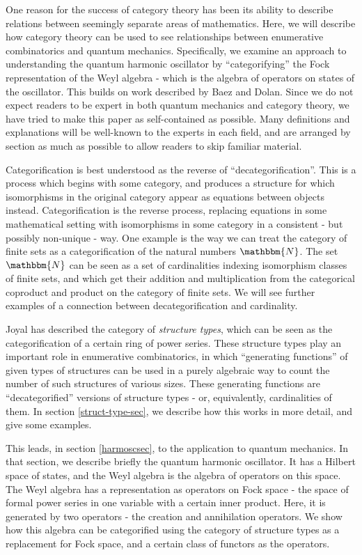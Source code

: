 \documentclass{amsart} \usepackage{amsmath,amssymb,bbm}
\begin{document}
One reason for the success of category theory has been its ability to
describe relations between seemingly separate areas of mathematics.
Here, we will describe how category theory can be used to see
relationships between enumerative combinatorics and quantum
mechanics. Specifically, we examine an approach to understanding the
quantum harmonic oscillator by ``categorifying'' the Fock
representation of the Weyl algebra - which is the algebra of operators
on states of the oscillator.  This builds on work described by Baez
and Dolan\cite{finfeyn}.  Since we do not expect readers to be expert
in both quantum mechanics and category theory, we have tried to make
this paper as self-contained as possible.  Many definitions and
explanations will be well-known to the experts in each field, and are
arranged by section as much as possible to allow readers to skip
familiar material.

Categorification is best understood as the reverse of
``decategorification''.  This is a process which begins with some
category, and produces a structure for which isomorphisms in the
original category appear as equations between objects instead.
Categorification is the reverse process, replacing equations in some
mathematical setting with isomorphisms in some category in a
consistent - but possibly non-unique - way.  One example is the way we
can treat the category of finite sets as a categorification of the
natural numbers $\mathbbm{N}$.  The set $\mathbbm{N}$ can be seen as a
set of cardinalities indexing isomorphism classes of finite sets, and
which get their addition and multiplication from the categorical
coproduct and product on the category of finite sets.  We will see
further examples of a connection between decategorification and
cardinality.

Joyal {\cite{joyal2}} has described the category of {\textit{structure
types}}, which can be seen as the categorification of a certain ring
of power series.  These structure types play an important role in
enumerative combinatorics, in which ``generating functions'' of given
types of structures can be used in a purely algebraic way to count the
number of such structures of various sizes. These generating functions
are ``decategorified'' versions of structure types - or, equivalently,
cardinalities of them.  In section \ref{struct-type-sec}, we describe
how this works in more detail, and give some examples.

This leads, in section \ref{harmoscsec}, to the application to quantum
mechanics.  In that section, we describe briefly the quantum harmonic
oscillator.  It has a Hilbert space of states, and the Weyl algebra is
the algebra of operators on this space.  The Weyl algebra has a
representation as operators on Fock space - the space of formal power
series in one variable with a certain inner product.  Here, it is
generated by two operators - the creation and annihilation operators.
We show how this algebra can be categorified using the category of
structure types as a replacement for Fock space, and a certain class
of functors as the operators.
\end{document}
